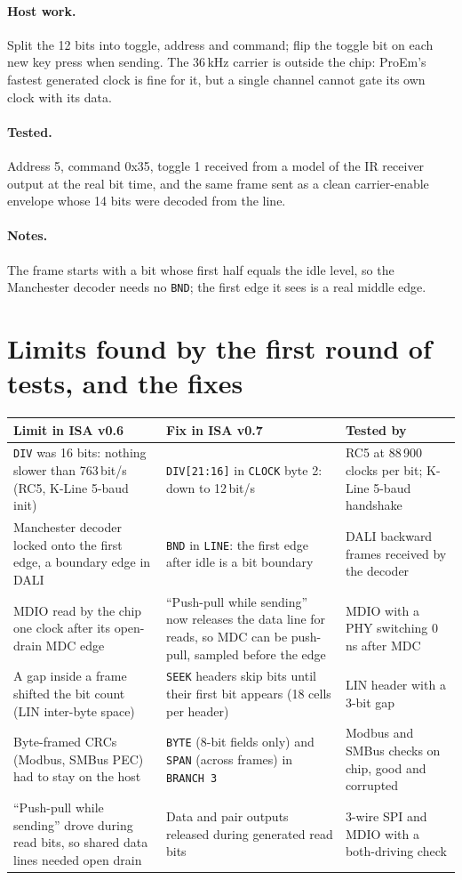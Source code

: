 \documentclass[11pt,a4paper]{article}
\newcommand{\sig}[1]{\texttt{#1}}
\begin{document}
\paragraph{Host work.} Split the 12 bits into toggle, address and command; flip the toggle bit on each new key press when sending. The 36\,kHz carrier is outside the chip: ProEm's fastest generated clock is fine for it, but a single channel cannot gate its own clock with its data.

\paragraph{Tested.} Address 5, command 0x35, toggle 1 received from a model of the IR receiver output at the real bit time, and the same frame sent as a clean carrier-enable envelope whose 14 bits were decoded from the line.
\paragraph{Notes.} The frame starts with a bit whose first half equals the idle level, so the Manchester decoder needs no \sig{BND}; the first edge it sees is a real middle edge.
\section{Limits found by the first round of tests, and the fixes}
\begin{center}
\begin{tabularx}{\linewidth}{@{}>{\raggedright\arraybackslash}p{3.6cm} L L@{}}
\toprule
Limit in ISA v0.6 & Fix in ISA v0.7 & Tested by \\
\midrule
\sig{DIV} was 16 bits: nothing slower than 763\,bit/s (RC5, K-Line 5-baud init) & \sig{DIV[21:16]} in \sig{CLOCK} byte 2: down to 12\,bit/s & RC5 at 88\,900 clocks per bit; K-Line 5-baud handshake \\
Manchester decoder locked onto the first edge, a boundary edge in DALI & \sig{BND} in \sig{LINE}: the first edge after idle is a bit boundary & DALI backward frames received by the decoder \\
MDIO read by the chip one clock after its open-drain MDC edge & ``Push-pull while sending'' now releases the data line for reads, so MDC can be push-pull, sampled before the edge & MDIO with a PHY switching 0\,ns after MDC \\
A gap inside a frame shifted the bit count (LIN inter-byte space) & \sig{SEEK} headers skip bits until their first bit appears (18 cells per header) & LIN header with a 3-bit gap \\
Byte-framed CRCs (Modbus, SMBus PEC) had to stay on the host & \sig{BYTE} (8-bit fields only) and \sig{SPAN} (across frames) in \sig{BRANCH 3} & Modbus and SMBus checks on chip, good and corrupted \\
``Push-pull while sending'' drove during read bits, so shared data lines needed open drain & Data and pair outputs released during generated read bits & 3-wire SPI and MDIO with a both-driving check \\
\bottomrule
\end{tabularx}
\end{center}
\end{document}
